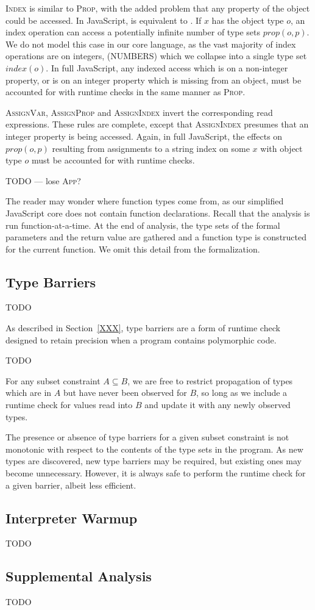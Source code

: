 \textsc{Index} is similar to \textsc{Prop}, with the added problem that any
property of the object could be accessed.  In JavaScript,  is
equivalent to . If $x$ has the object type $o$, an index operation
can access a potentially infinite number of type sets $\mathit{prop}(o,p)$. We
do not model this case in our core language, as the vast majority of index
operations are on integers, (NUMBERS) which we collapse into a single type set
$\mathit{index}(o)$.  In full JavaScript, any indexed access which is on a
non-integer property, or is on an integer property which is missing from an
object, must be accounted for with runtime checks in the same manner as
\textsc{Prop}.

\textsc{AssignVar}, \textsc{AssignProp} and \textsc{AssignIndex} invert the
corresponding read expressions.  These rules are complete, except that
\textsc{AssignIndex} presumes that an integer property is being accessed.
Again, in full JavaScript, the effects on $\mathit{prop}(o,p)$ resulting from
assignments to a string index  on some $x$ with object type $o$
must be accounted for with runtime checks.

TODO --- lose \textsc{App}?

The reader may wonder where function types come from, as our simplified
JavaScript core does not contain function declarations. Recall that the
analysis is run function-at-a-time. At the end of analysis, the type sets of
the formal parameters and the return value are gathered and a function type is
constructed for the current function. We omit this detail from the
formalization.

\subsection{Type Barriers}

TODO

As described in Section~\ref{XXX}, type barriers are a form of runtime
check designed to retain precision when a program contains polymorphic code.

TODO

For any subset constraint $A \subseteq B$, we are free to restrict
propagation of types which are in $A$ but have never been observed for $B$,
so long as we include a runtime check for values read into $B$ and update
it with any newly observed types.

The presence or absence of type barriers for a given subset constraint
is not monotonic with respect to the contents of the type sets in the program.
As new types are discovered, new type barriers may be required, but existing
ones may become unnecessary.
However, it is always safe to perform the runtime check for a given barrier,
albeit less efficient.

\subsection{Interpreter Warmup}

TODO

\subsection{Supplemental Analysis}

TODO

